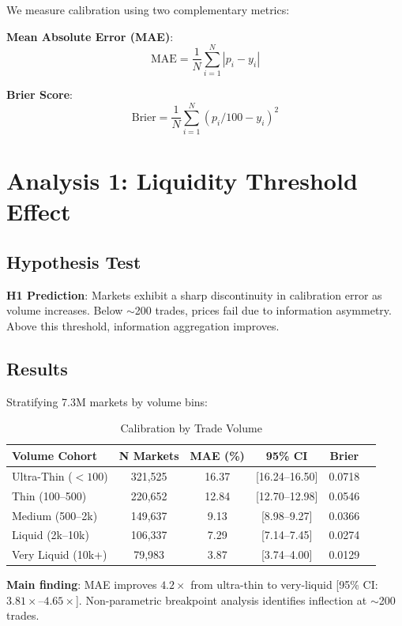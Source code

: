 \documentclass[a4paper,11pt]{article}
\theoremstyle{plain}
\theoremstyle{definition}
\begin{document}
We measure calibration using two complementary metrics:

\textbf{Mean Absolute Error (MAE)}:
$$\text{MAE} = \frac{1}{N} \sum_{i=1}^{N} |p_i - y_i|$$

\textbf{Brier Score}:
$$\text{Brier} = \frac{1}{N} \sum_{i=1}^{N} (p_i/100 - y_i)^2$$

\section{Analysis 1: Liquidity Threshold Effect}
\label{sec:analysis1}

\subsection{Hypothesis Test}

\textbf{H1 Prediction}: Markets exhibit a sharp discontinuity in calibration error as volume increases. Below $\sim$200 trades, prices fail due to information asymmetry. Above this threshold, information aggregation improves.

\subsection{Results}

Stratifying 7.3M markets by volume bins:

\begin{table}[h]
\centering
\small
\begin{tabular}{lccccc}
\toprule
\textbf{Volume Cohort} & \textbf{N Markets} & \textbf{MAE (\%)} & \textbf{95\% CI} & \textbf{Brier} \\
\midrule
Ultra-Thin ($<100$) & 321,525 & 16.37 & [16.24--16.50] & 0.0718 \\
Thin (100--500) & 220,652 & 12.84 & [12.70--12.98] & 0.0546 \\
Medium (500--2k) & 149,637 & 9.13 & [8.98--9.27] & 0.0366 \\
Liquid (2k--10k) & 106,337 & 7.29 & [7.14--7.45] & 0.0274 \\
Very Liquid (10k+) & 79,983 & 3.87 & [3.74--4.00] & 0.0129 \\
\bottomrule
\end{tabular}
\caption{Calibration by Trade Volume}
\label{tab:volume}
\end{table}

\textbf{Main finding}: MAE improves $4.2\times$ from ultra-thin to very-liquid [95\% CI: $3.81\times$--$4.65\times$]. Non-parametric breakpoint analysis identifies inflection at $\sim$200 trades.
\end{document}
